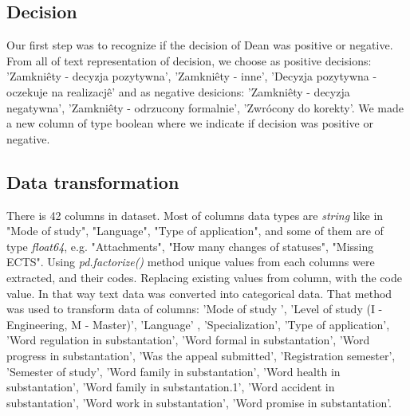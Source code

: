 \subsection{Decision}
Our first step was to recognize if the decision of Dean was positive or negative.
From all of text representation of decision, we  choose  as positive decisions: 'Zamkniêty - decyzja pozytywna', 'Zamkniêty - inne', 'Decyzja pozytywna - oczekuje na realizacjê' and as negative desicions: 'Zamkniêty - decyzja negatywna', 'Zamkniêty - odrzucony formalnie', 'Zwrócony do korekty'.
We made a new column of type boolean where we indicate if decision was positive or negative.

\subsection{Data transformation}
There is 42 columns in dataset. Most of columns data types are \textit{string} like in "Mode of study", "Language", "Type of application", and some of them are of type \textit{float64}, e.g. "Attachments", "How many changes of statuses", "Missing ECTS".
Using \textit{pd.factorize()} method unique values from each columns were extracted, and their codes. Replacing existing values from column, with the code value. In that way text data was converted into categorical data. That method was used to transform data of columns: 'Mode of study ', 'Level of study (I - Engineering, M - Master)', 'Language' , 'Specialization', 'Type of application', 'Word regulation in substantation', 'Word formal in substantation', 'Word progress in substantation', 'Was the appeal submitted', 'Registration semester', 'Semester of study', 'Word family in substantation', 'Word health in substantation', 'Word family in substantation.1', 'Word accident in substantation', 'Word work in substantation', 'Word promise  in substantation'.